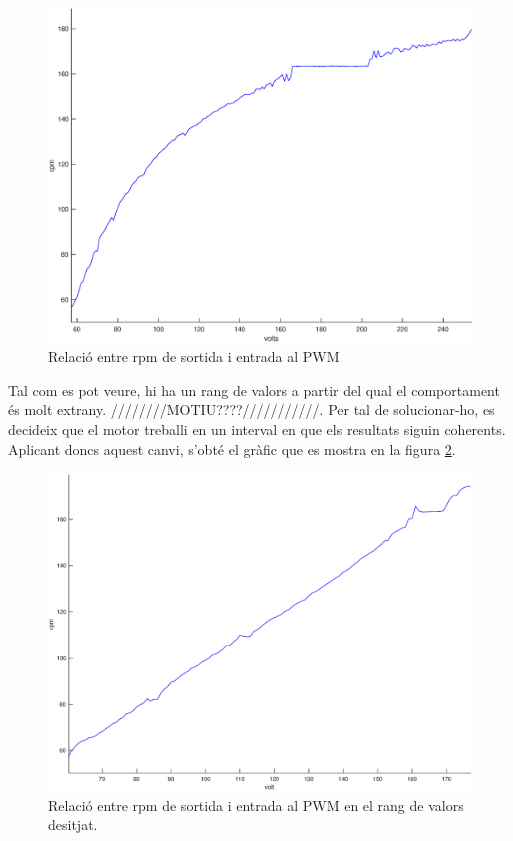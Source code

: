 \documentclass[]{article}
\begin{document}
\begin{figure}[H]
\centering
	\includegraphics[width = .8\linewidth]{images/rpm_volt_dades.eps}
	\caption{Relació entre rpm de sortida i entrada al PWM}
	\label{fig:rpm_volt_dades}
\end{figure}

Tal com es pot veure, hi ha un rang de valors a partir del qual el comportament és molt extrany. ////////MOTIU????///////////. Per tal de solucionar-ho, es decideix que el motor treballi en un interval en que els resultats siguin coherents. Aplicant doncs aquest canvi, s'obté el gràfic que es mostra en la figura \ref{fig:Rang_Operacional_Motor}.

\begin{figure}[H]
\centering
	\includegraphics[width = .8\linewidth]{images/Rang_Operacional_Motor.eps}
	\caption{Relació entre rpm de sortida i entrada al PWM en el rang de valors desitjat.}
	\label{fig:Rang_Operacional_Motor}
\end{figure}
\end{document}
